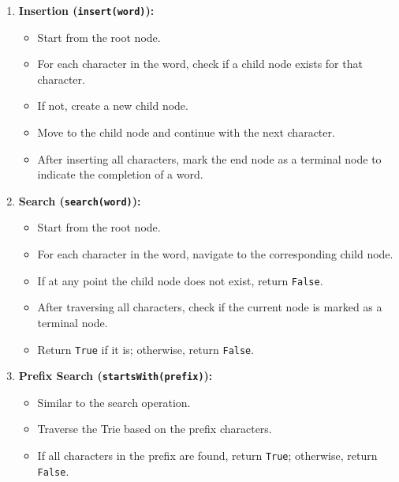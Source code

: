 \begin{enumerate}
    \item \textbf{Insertion (\texttt{insert(word)}):}
    \begin{itemize}
        \item Start from the root node.
        \item For each character in the word, check if a child node exists for that character.
        \item If not, create a new child node.
        \item Move to the child node and continue with the next character.
        \item After inserting all characters, mark the end node as a terminal node to indicate the completion of a word.
    \end{itemize}
    
    \item \textbf{Search (\texttt{search(word)}):}
    \begin{itemize}
        \item Start from the root node.
        \item For each character in the word, navigate to the corresponding child node.
        \item If at any point the child node does not exist, return \texttt{False}.
        \item After traversing all characters, check if the current node is marked as a terminal node.
        \item Return \texttt{True} if it is; otherwise, return \texttt{False}.
    \end{itemize}
    
    \item \textbf{Prefix Search (\texttt{startsWith(prefix)}):}
    \begin{itemize}
        \item Similar to the search operation.
        \item Traverse the Trie based on the prefix characters.
        \item If all characters in the prefix are found, return \texttt{True}; otherwise, return \texttt{False}.
    \end{itemize}
\end{enumerate}


